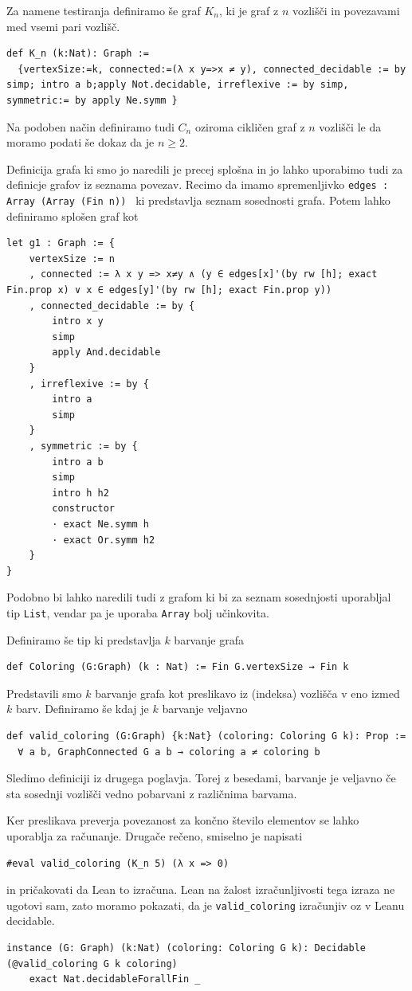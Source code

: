 \documentclass[mat1]{fmfdelo}
\begin{document}
Za namene testiranja definiramo še graf $K_n$, ki je graf z $n$ vozlišči in povezavami med vsemi pari vozlišč.
\begin{lstlisting}
def K_n (k:Nat): Graph :=
  {vertexSize:=k, connected:=(λ x y=>x ≠ y), connected_decidable := by simp; intro a b;apply Not.decidable, irreflexive := by simp, symmetric:= by apply Ne.symm }
\end{lstlisting}
Na podoben način definiramo tudi $C_n$ oziroma cikličen graf z $n$ vozlišči le da moramo podati še dokaz da je $n\ge2$.

Definicija grafa ki smo jo naredili je precej splošna in jo lahko uporabimo tudi za definicje grafov iz seznama povezav.
Recimo da imamo spremenljivko \lstinline{edges :  Array (Array (Fin n)) } ki predstavlja seznam sosednosti grafa.
Potem lahko definiramo splošen graf kot
\begin{lstlisting}
let g1 : Graph := {
    vertexSize := n
    , connected := λ x y => x≠y ∧ (y ∈ edges[x]'(by rw [h]; exact Fin.prop x) ∨ x ∈ edges[y]'(by rw [h]; exact Fin.prop y))
    , connected_decidable := by {
        intro x y
        simp
        apply And.decidable
    }
    , irreflexive := by {
        intro a
        simp
    }
    , symmetric := by {
        intro a b
        simp
        intro h h2
        constructor
        · exact Ne.symm h
        · exact Or.symm h2
    }
}
\end{lstlisting}
Podobno bi lahko naredili tudi z grafom ki bi za seznam sosednjosti uporabljal tip \lstinline{List}, vendar pa je uporaba \lstinline{Array} 
bolj učinkovita.

Definiramo še tip ki predstavlja $k$ barvanje grafa
\begin{lstlisting}
def Coloring (G:Graph) (k : Nat) := Fin G.vertexSize → Fin k
\end{lstlisting}

Predstavili smo $k$ barvanje grafa kot preslikavo iz (indeksa) vozlišča v eno izmed $k$ barv.
Definiramo še kdaj je $k$ barvanje veljavno
\begin{lstlisting}
def valid_coloring (G:Graph) {k:Nat} (coloring: Coloring G k): Prop :=
  ∀ a b, GraphConnected G a b → coloring a ≠ coloring b
\end{lstlisting}
Sledimo definiciji iz drugega poglavja. Torej z besedami, barvanje je veljavno 
če sta sosednji vozlišči vedno pobarvani z različnima barvama.

Ker preslikava preverja povezanost za končno število elementov se lahko uporablja za računanje. Drugače rečeno, smiselno
je napisati
\begin{lstlisting}
#eval valid_coloring (K_n 5) (λ x => 0)
\end{lstlisting}
in pričakovati da Lean to izračuna. Lean na žalost izračunljivosti tega izraza ne ugotovi sam, zato moramo pokazati, 
da je \lstinline{valid_coloring} izračunjiv oz v Leanu decidable.
\begin{lstlisting}
instance (G: Graph) (k:Nat) (coloring: Coloring G k): Decidable (@valid_coloring G k coloring)
    exact Nat.decidableForallFin _
\end{lstlisting}
\end{document}
